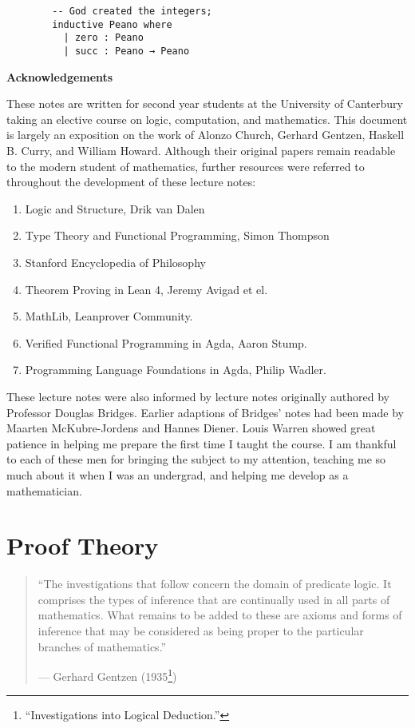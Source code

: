 \documentclass{book}
\begin{document}
    \begin{lstlisting}
        -- God created the integers;
        inductive Peano where
          | zero : Peano
          | succ : Peano → Peano
    \end{lstlisting} 
    


    \newpage
    {\bf Acknowledgements} 

    These notes are written for second year students at the University of Canterbury taking an elective course on logic, computation, and mathematics. This document is largely an exposition on the work of Alonzo Church, Gerhard Gentzen, Haskell B. Curry, and William Howard. Although their original papers remain readable to the modern student of mathematics, further resources were referred to throughout the development of these lecture notes:

        \begin{enumerate}
            \item Logic and Structure, Drik van Dalen \cite{vDalen}
            \item Type Theory and Functional Programming, Simon Thompson \cite{thompson}
            \item Stanford Encyclopedia of Philosophy
            \item Theorem Proving in Lean 4, Jeremy Avigad et el.
            \item MathLib, Leanprover Community. 
            \item Verified Functional Programming in Agda, Aaron Stump.
            \item Programming Language Foundations in Agda, Philip Wadler. 
        \end{enumerate}    
    
    These lecture notes were also informed by lecture notes originally authored by Professor Douglas Bridges. Earlier adaptions of Bridges' notes had been made by Maarten McKubre-Jordens and Hannes Diener. Louis Warren showed great patience in helping me prepare the first time I taught the course. I am thankful to each of these men for bringing the subject to my attention, teaching me so much about it when I was an undergrad, and helping me develop as a mathematician. 

\chapter{Proof Theory}

\begin{quote}
    ``The investigations that follow concern the domain of predicate logic. It comprises the types of inference that are continually used in all parts of mathematics. What remains to be added to these are axioms and forms of inference that may be considered as being proper to the particular branches of mathematics.''
    \begin{flushright}
        --- Gerhard Gentzen (1935\footnote{``Investigations into Logical Deduction.''})
    \end{flushright}
\end{quote}
\end{document}
